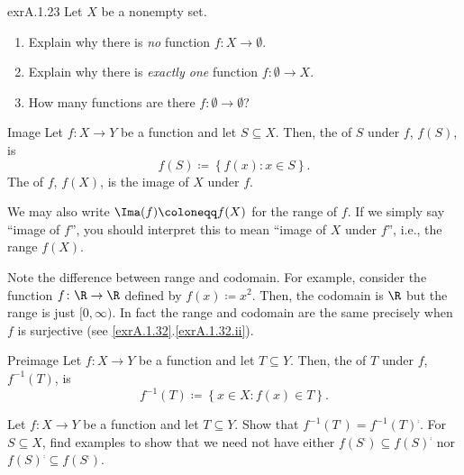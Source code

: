 \begin{exr}{}{exrA.1.23}
Let $X$ be a nonempty set.
\begin{enumerate}
\item \label{enmA.1.23.i}Explain why there is \emph{no} function $f\colon X\rightarrow \emptyset$.
\item \label{enmA.1.23.ii}Explain why there is \emph{exactly one} function $f\colon \emptyset \rightarrow X$.
\item \label{enmA.1.23.iii}How many functions are there $f\colon \emptyset \rightarrow \emptyset$?
\end{enumerate}
\end{exr}
\begin{dfn}{Image}{}
Let $f\colon X\rightarrow Y$ be a function and let $S\subseteq X$.  Then, the  of $S$ under $f$, $f(S)$, is
\begin{equation}
f(S)\coloneqq \left\{ f(x):x\in S\right\} .
\end{equation}
The  of $f$, $f(X)$, is the image of $X$ under $f$.
\begin{rmk}
We may also write $\Ima (f)\coloneqq f(X)$ for the range of $f$.  If we simply say ``image of $f$'', you should interpret this to mean ``image of $X$ under $f$'', i.e., the range $f(X)$.
\end{rmk}
\begin{rmk}
Note the difference between range and codomain.  For example, consider the function $f\colon \R \rightarrow \R$ defined by $f(x)\coloneqq x^2$.  Then, the codomain is $\R$ but the range is just $[0,\infty )$.  In fact the range and codomain are the same precisely when $f$ is surjective (see \cref{exrA.1.32}.\cref{exrA.1.32.ii}).
\end{rmk}
\end{dfn}
\begin{dfn}{Preimage}{}
Let $f\colon X\rightarrow Y$ be a function and let $T\subseteq Y$.  Then, the  of $T$ under $f$, $f^{-1}(T)$, is
\begin{equation}
f^{-1}(T)\coloneqq \left\{ x\in X:f(x)\in T\right\} .
\end{equation}
\end{dfn}
\begin{exr}{}{}
Let $f\colon X\rightarrow Y$ be a function and let $T\subseteq Y$.  Show that $f^{-1}(T^{\comp})=f^{-1}(T)^{\comp}$.  For $S\subseteq X$, find examples to show that we need not have either $f(S^{\comp})\subseteq f(S)^{\comp}$ nor $f(S)^{\comp}\subseteq f(S^{\comp})$.
\end{exr}
